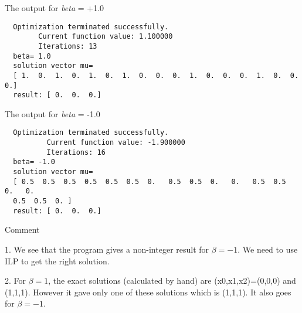 \documentclass[12pt,a4paper]{scrartcl}
\begin{document}
The output for \textit{beta} = +1.0
\begin{verbatim}
  Optimization terminated successfully.
        Current function value: 1.100000    
        Iterations: 13
  beta= 1.0
  solution vector mu=
  [ 1.  0.  1.  0.  1.  0.  1.  0.  0.  0.  1.  0.  0.  0.  1.  0.  0.  0.]
  result: [ 0.  0.  0.]
\end{verbatim}

The output for \textit{beta} = -1.0
\begin{verbatim}
  Optimization terminated successfully.
          Current function value: -1.900000   
          Iterations: 16
  beta= -1.0
  solution vector mu=
  [ 0.5  0.5  0.5  0.5  0.5  0.5  0.   0.5  0.5  0.   0.   0.5  0.5  0.   0.
  0.5  0.5  0. ]
  result: [ 0.  0.  0.]
\end{verbatim}

Comment


1. We see that the program gives a non-integer result for $\beta=-1$. We need to use ILP to get the right solution.

2. For \(\beta=1\), the exact solutions (calculated by hand) are (x0,x1,x2)=(0,0,0) and (1,1,1). However it gave only one of these solutions which is (1,1,1). It also goes for \(\beta=-1\).

\clearpage

\end{document}
